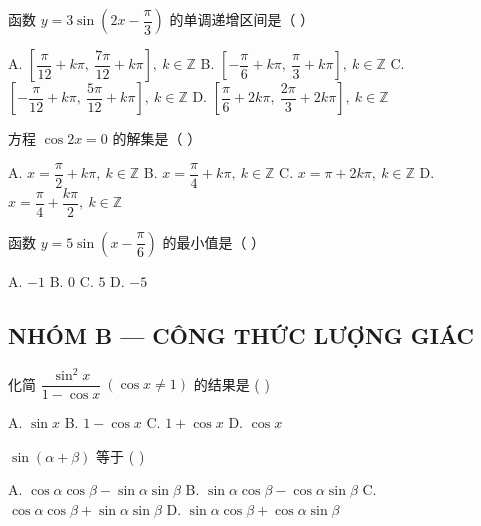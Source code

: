 \documentclass[11pt, a4paper]{article}
\begin{document}
\begin{baitap}[11]
函数 $y = 3\sin\!\left(2x - \dfrac{\pi}{3}\right)$ 的单调递增区间是（ ）
\par\vspace{3pt}
\noindent A. $\left[\dfrac{\pi}{12} + k\pi,\ \dfrac{7\pi}{12} + k\pi\right],\ k \in \mathbb{Z}$ \quad B. $\left[-\dfrac{\pi}{6} + k\pi,\ \dfrac{\pi}{3} + k\pi\right],\ k \in \mathbb{Z}$ \quad C. $\left[-\dfrac{\pi}{12} + k\pi,\ \dfrac{5\pi}{12} + k\pi\right],\ k \in \mathbb{Z}$ \quad D. $\left[\dfrac{\pi}{6} + 2k\pi,\ \dfrac{2\pi}{3} + 2k\pi\right],\ k \in \mathbb{Z}$
\end{baitap}

\begin{baitap}[12]
方程 $\cos 2x = 0$ 的解集是（ ）
\par\vspace{3pt}
\noindent A. $x = \dfrac{\pi}{2} + k\pi,\ k \in \mathbb{Z}$ \quad B. $x = \dfrac{\pi}{4} + k\pi,\ k \in \mathbb{Z}$ \quad C. $x = \pi + 2k\pi,\ k \in \mathbb{Z}$ \quad D. $x = \dfrac{\pi}{4} + \dfrac{k\pi}{2},\ k \in \mathbb{Z}$
\end{baitap}

\begin{baitap}[13]
函数 $y = 5\sin\!\left(x - \dfrac{\pi}{6}\right)$ 的最小值是（ ）
\par\vspace{3pt}
\noindent A. $-1$ \quad B. $0$ \quad C. $5$ \quad D. $-5$
\end{baitap}

\subsection*{NHÓM B — CÔNG THỨC LƯỢNG GIÁC}

\begin{baitap}[14]
化简 $\dfrac{\sin^2 x}{1 - \cos x}\ (\cos x \ne 1)$ 的结果是 ( )
\par\vspace{3pt}
\noindent A. $\sin x$ \quad B. $1 - \cos x$ \quad C. $1 + \cos x$ \quad D. $\cos x$
\end{baitap}

\begin{baitap}[15]
$\sin(\alpha + \beta)$ 等于 ( )
\par\vspace{3pt}
\noindent A. $\cos\alpha \cos\beta - \sin\alpha \sin\beta$ \quad B. $\sin\alpha \cos\beta - \cos\alpha \sin\beta$ \quad C. $\cos\alpha \cos\beta + \sin\alpha \sin\beta$ \quad D. $\sin\alpha \cos\beta + \cos\alpha \sin\beta$
\end{baitap}
\end{document}
